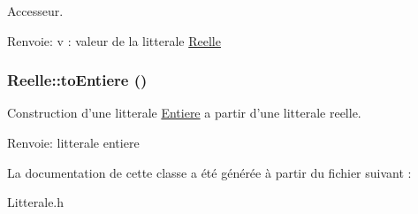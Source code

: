 Accesseur. 

\begin{Desc}
\item[Renvoie:]v : valeur de la litterale \hyperlink{class_reelle}{Reelle} \end{Desc}
\hypertarget{class_reelle_9a9cb01d74565fa4e702044ffc3fceb7}{
\subsubsection[{toEntiere}]{ Reelle::toEntiere ()}}
\label{class_reelle_9a9cb01d74565fa4e702044ffc3fceb7}


Construction d'une litterale \hyperlink{class_entiere}{Entiere} a partir d'une litterale reelle. 

\begin{Desc}
\item[Renvoie:]litterale entiere \end{Desc}


La documentation de cette classe a été générée à partir du fichier suivant :\begin{CompactItemize}
\item 
Litterale.h\end{CompactItemize}
